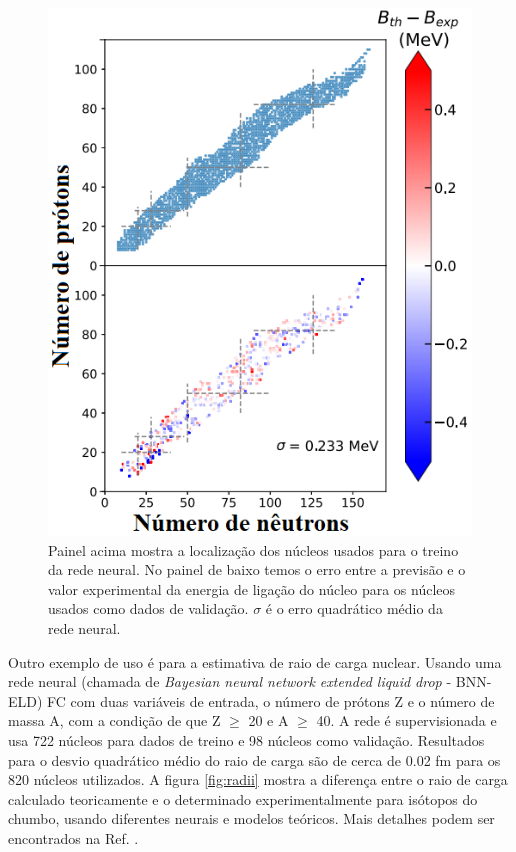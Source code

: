 \documentclass[a4paper,12pt,oneside]{book}
\begin{document}
\begin{appendices}
\begin{figure}[H]
    \centering
    \includegraphics[scale = 0.60]{figs/nuclei_mass.png}
    \caption{Painel acima mostra a localização dos núcleos usados para o treino da rede neural. No painel de baixo temos o erro entre a previsão e o valor experimental da energia de ligação do núcleo para os núcleos usados como dados de validação. $\sigma$ é o erro quadrático médio da rede neural.}
    \label{fig:nuclei_mass_ml}
\end{figure}

\par Outro exemplo de uso é para a estimativa de raio de carga nuclear. Usando uma rede neural (chamada de \textit{Bayesian neural network extended liquid drop} - BNN-ELD) FC com duas variáveis de entrada, o número de prótons Z e o número de massa A, com a condição de que Z $\geq$ 20 e A $\geq$ 40. A rede é supervisionada e usa 722 núcleos para dados de treino e 98 núcleos como validação. Resultados para o desvio quadrático médio do raio de carga são de cerca de 0.02 fm para os 820 núcleos utilizados. A figura \ref{fig:radii} mostra a diferença entre o raio de carga calculado teoricamente e o determinado experimentalmente para isótopos do chumbo, usando diferentes neurais e modelos teóricos. Mais detalhes podem ser encontrados na Ref. \cite{raio_carga}.


\end{appendices}
\end{document}
